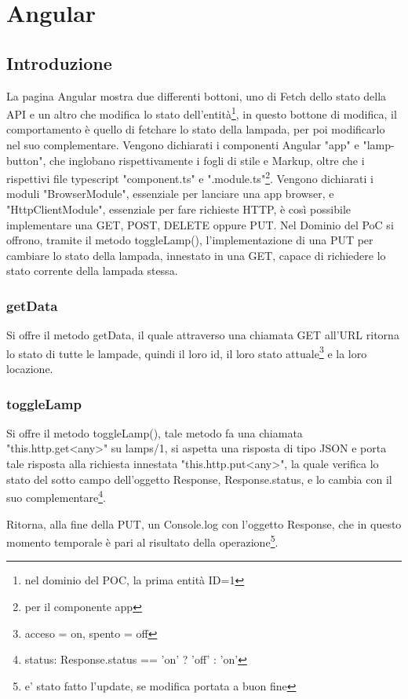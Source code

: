 \chapter{Angular}\label{angular}

\section{Introduzione}

La pagina Angular mostra due differenti bottoni, uno di Fetch dello stato della API e un altro che modifica lo stato dell'entità\footnote{nel dominio del POC, la prima entità ID=1}, in questo bottone di modifica, il comportamento è quello di fetchare lo stato della lampada, per poi modificarlo nel suo complementare.
Vengono dichiarati i componenti Angular "app" e "lamp-button", che inglobano rispettivamente i fogli di stile e Markup, oltre che i rispettivi file typescript "component.ts" e ".module.ts"\footnote{per il componente app}. 
Vengono dichiarati i moduli "BrowserModule", essenziale per lanciare una app browser, e "HttpClientModule", essenziale per fare richieste HTTP, è così possibile implementare una GET, POST, DELETE oppure PUT.
Nel Dominio del PoC si offrono, tramite il metodo toggleLamp(), l'implementazione di una PUT per cambiare lo stato della lampada, innestato in una GET, capace di richiedere lo stato corrente della lampada stessa.

\subsection{getData}

Si offre il metodo getData, il quale attraverso una chiamata GET all'URL ritorna lo stato di tutte le lampade, quindi il loro id, il loro stato attuale\footnote{acceso = on, spento = off} e la loro locazione.

\subsection{toggleLamp}

Si offre il metodo toggleLamp(), tale metodo fa una chiamata "this.http.get<any>" su lamps/1, si aspetta una risposta di tipo JSON e porta tale risposta alla richiesta innestata "this.http.put<any>", la quale verifica lo stato del sotto campo dell'oggetto Response, Response.status, e lo cambia con il suo complementare\footnote{status: Response.status == 'on' ? 'off' : 'on'}.

Ritorna, alla fine della PUT, un Console.log con l'oggetto Response, che in questo momento temporale è pari al risultato della operazione\footnote{e' stato fatto l'update, se modifica portata a buon fine}.


